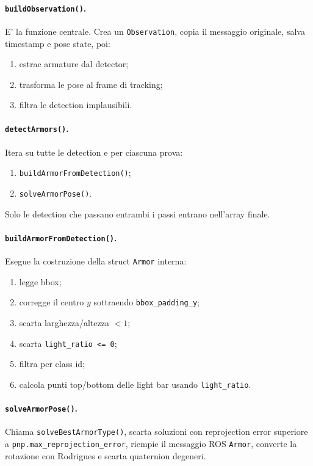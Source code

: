 \documentclass[11pt,a4paper]{article}
\newcommand{\code}[1]{\texttt{#1}}
\begin{document}
\paragraph{\code{buildObservation()}.}
E' la funzione centrale. Crea un \code{Observation}, copia il messaggio originale, salva timestamp e pose state, poi:
\begin{enumerate}[leftmargin=1.4em]
  \item estrae armature dal detector;
  \item trasforma le pose al frame di tracking;
  \item filtra le detection implausibili.
\end{enumerate}

\paragraph{\code{detectArmors()}.}
Itera su tutte le detection e per ciascuna prova:
\begin{enumerate}[leftmargin=1.4em]
  \item \code{buildArmorFromDetection()};
  \item \code{solveArmorPose()}.
\end{enumerate}
Solo le detection che passano entrambi i passi entrano nell'array finale.

\paragraph{\code{buildArmorFromDetection()}.}
Esegue la costruzione della struct \code{Armor} interna:
\begin{enumerate}[leftmargin=1.4em]
  \item legge bbox;
  \item corregge il centro \(y\) sottraendo \code{bbox\_padding\_y};
  \item scarta larghezza/altezza \(<1\);
  \item scarta \code{light\_ratio <= 0};
  \item filtra per class id;
  \item calcola punti top/bottom delle light bar usando \code{light\_ratio}.
\end{enumerate}

\paragraph{\code{solveArmorPose()}.}
Chiama \code{solveBestArmorType()}, scarta soluzioni con reprojection error superiore a \code{pnp.max\_reprojection\_error}, riempie il messaggio ROS \code{Armor}, converte la rotazione con Rodrigues e scarta quaternion degeneri.
\end{document}
